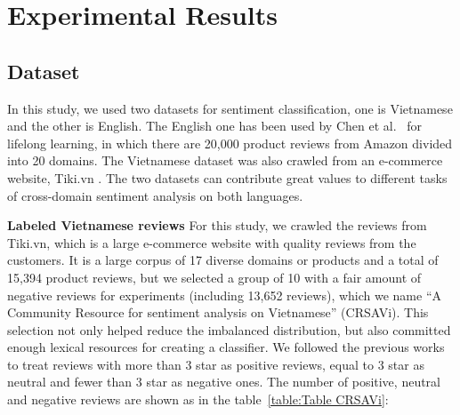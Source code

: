 \section{Experimental Results}

\subsection{Dataset}

In this study, we used two datasets for sentiment classification, one is Vietnamese and the other is English. 
The English one has been used by Chen et al.~\cite{chen-ma-liu:2015:ACL-IJCNLP} for lifelong learning, in which there are 20,000 product reviews from Amazon divided into 20 domains.
The Vietnamese dataset was also crawled from an e-commerce website, Tiki.vn . %
The two datasets can contribute great values to different tasks of cross-domain sentiment analysis on both languages. 

\textbf{Labeled Vietnamese reviews} For this study, we crawled the reviews from Tiki.vn, which is a large e-commerce website with quality reviews from the customers.
It is a large corpus of 17 diverse domains or products and a total of 15,394 product reviews, but we selected a group of 10 with a fair amount of negative reviews for experiments (including 13,652 reviews), which we name ``A Community Resource for sentiment analysis on Vietnamese'' (CRSAVi).
This selection not only helped reduce the imbalanced distribution, but also committed enough lexical resources for creating a classifier.
We followed the previous works~\cite{blitzer-dredze-pereira:2007:ACLMain,pang-lee-vaithyanathan:2002:EMNLP02} to treat reviews with more than 3 star as positive reviews, equal to 3 star as neutral and fewer than 3 star as negative ones.
The number of positive, neutral and negative reviews are shown as in the table~\ref{table:Table CRSAVi}:

